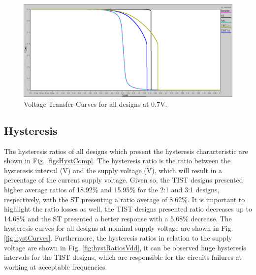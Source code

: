 \documentclass[pgmicro,mestrado,english]{iiufrgs}
\begin{document}
        \begin{figure}[]
        \centering
            \includegraphics[width=1\textwidth, trim={0cm 0cm 0cm 0cm}, clip]{vtcs07.png}
            \caption{Voltage Transfer Curves for all designs at 0.7V.}
        \label{fig:vtcs07}
    \end{figure}

\subsection{Hysteresis}

    The hysteresis ratios of all designs which present the hysteresis characteristic are shown in Fig. \ref{figsHystComp}. The hysteresis ratio is the ratio between the hysteresis interval (V) and the supply voltage (V), which will result in a percentage of the current supply voltage. Given so, the TIST designs presented higher average ratios of 18.92\% and 15.95\% for the 2:1 and 3:1 designs, respectively, with the ST presenting a ratio average of 8.62\%. It is important to highlight the ratio losses as well, the TIST designs presented ratio decreases up to 14.68\% and the ST presented a better response with a 5.68\% decrease. The hysteresis curves for all designs at nominal supply voltage are shown in Fig. \ref{fig:hystCurves}. Furthermore, the hysteresis ratios in relation to the supply voltage are shown in Fig. \ref{fig:hystRatiosVdd}, it can be observed huge hysteresis intervals for the TIST designs, which are responsible for the circuits failures at working at acceptable frequencies. 


\end{document}
